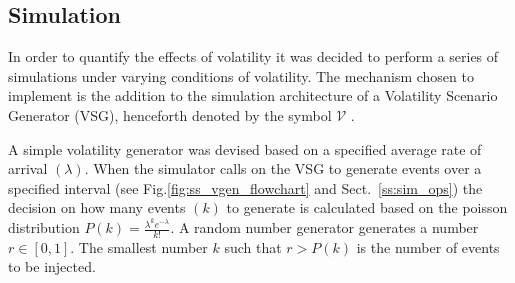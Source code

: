 \subsection{Simulation}
In order to quantify the effects of volatility it was decided to perform a series of simulations under varying conditions of volatility. The mechanism chosen to implement is the addition to the simulation architecture of a Volatility Scenario Generator (VSG), henceforth denoted by the symbol $\mathcal{V}$ .

A simple volatility generator was devised based on a specified average rate of arrival $(\lambda)$. When the simulator calls on the VSG to generate events over a specified interval (see Fig.\ref{fig:ss_vgen_flowchart} and Sect.~\ref{ss:sim_ops}) the decision on how many events $(k)$ to generate is calculated based on the poisson distribution $P(k) = \frac{\lambda^k e^{-\lambda}}{k!}$. A random number generator generates a number $r \in [0,1]$. The smallest number $k$ such that $r > P(k)$ is the number of events to be injected.



